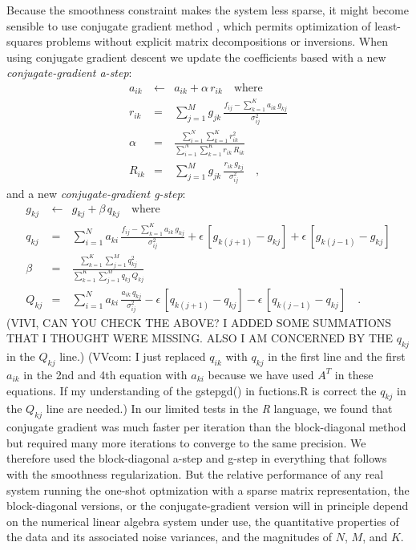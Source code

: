 \documentclass[12pt,preprint]{aastex}
\newcommand{\project}[1]{\textsl{#1}}
\begin{document}
Because the smoothness constraint makes the system less sparse, it
might become sensible to use conjugate gradient method \citep[for
  example,][]{shewchuk}, which permits optimization of least-squares
problems without explicit matrix decompositions or inversions.  When
using conjugate gradient descent we update the coefficients based with
a new \emph{conjugate-gradient a-step}:
\begin{eqnarray}\label{eq:astep_conj}\displaystyle
a_{ik} & \gets & a_{ik}+\alpha\,r_{ik} \quad \mbox{where} \nonumber\\
r_{ik} & = & \sum_{j=1}^{M}g_{jk}\,\frac{f_{ij}-\sum_{k=1}^{K}a_{ik}\,g_{kj}}{\sigma^2_{ij}} \nonumber\\
\alpha & = & \frac{\sum_{i=1}^{N}\sum_{k=1}^{K}r^2_{ik}}{\sum_{i=1}^{N}\sum_{k=1}^{K}r_{ik}\,R_{ik}} \nonumber\\
R_{ik} & = & \sum_{j=1}^{M}g_{jk}\,\frac{r_{ik}\,g_{kj}}{\sigma^2_{ij}}
\quad ,
\end{eqnarray}
and a new \emph{conjugate-gradient g-step}:
\begin{eqnarray}\label{eq:gstep_conj}\displaystyle
g_{kj} & \gets & g_{kj}+\beta\,q_{kj} \quad \mbox{where} \nonumber\\
q_{kj} & = & \sum_{i=1}^{N}a_{ki}\,\frac{f_{ij}-\sum_{k=1}^{K}a_{ik}\,g_{kj}}{\sigma^2_{ij}}+\epsilon\,[g_{k(j+1)}-g_{kj}]+\epsilon\,[g_{k(j-1)}-g_{kj}] \nonumber\\
\beta & = & \frac{\sum_{k=1}^{K}\sum_{j=1}^{M}q^2_{kj}}{\sum_{k=1}^{K}\sum_{j=1}^{M}q_{kj}\,Q_{kj}} \nonumber\\
Q_{kj} & = & \sum_{i=1}^{N}a_{ki}\,\frac{a_{ik}\,q_{kj}}{\sigma^2_{ij}}-\epsilon\,[q_{k(j+1)}-q_{kj}]-\epsilon\,[q_{k(j-1)}-q_{kj}]
\quad .
\end{eqnarray}
(VIVI, CAN YOU CHECK THE ABOVE?  I ADDED SOME SUMMATIONS THAT I
THOUGHT WERE MISSING.  ALSO I AM CONCERNED BY THE $q_{kj}$ in the
$Q_{kj}$ line.) (VVcom: I just replaced $q_{ik}$ with $q_{kj}$ in 
the first line and the first $a_{ik}$ in the 2nd and 4th equation 
with $a_{ki}$ because we have used $A^T$ in these equations. If my 
understanding of the gstepgd() in fuctions.R is correct the $q_{kj}$ in the
$Q_{kj}$ line are needed.) In our limited tests in the \project{R} language, we
found that conjugate gradient was much faster per iteration than the
block-diagonal method but required many more iterations to converge to
the same precision.  We therefore used the block-diagonal a-step and
g-step in everything that follows with the smoothness regularization.
But the relative performance of any real system running the one-shot
optmization with a sparse matrix representation, the block-diagonal
versions, or the conjugate-gradient version will in principle depend
on the numerical linear algebra system under use, the quantitative
properties of the data and its associated noise variances, and the
magnitudes of $N$, $M$, and $K$.
\end{document}
